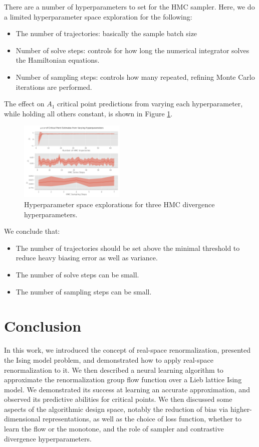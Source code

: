 \documentclass[%
    reprint,
    amsmath,amssymb,
    aps,
]{revtex4-2}
\begin{document}
There are a number of hyperparameters to set for the HMC sampler. 
Here, we do a limited hyperparameter space exploration for the following:
\begin{itemize}
    \item The number of trajectories: basically the sample batch size
    \item Number of solve steps: controls for how long the numerical integrator solves the Hamiltonian equations. 
    \item Number of sampling steps: controls how many repeated, refining Monte Carlo iterations are performed. 
\end{itemize}
The effect on $A_1$ critical point predictions from varying each hyperparameter, while holding all others constant, is shown in Figure \ref{fig:hmc-hyperparameters}. 

\begin{figure}[h]
    \includegraphics[width=0.45\textwidth]{tex/images/hmc-hyperparameters.png}
    \caption{\label{fig:hmc-hyperparameters}
        Hyperparameter space explorations for three HMC divergence hyperparameters. 
    }
\end{figure}

We conclude that:
\begin{itemize}
    \item The number of trajectories should be set above the minimal threshold to reduce heavy biasing error as well as variance. 
    \item The number of solve steps can be small. 
    \item The number of sampling steps can be small. 
\end{itemize}

\section{Conclusion}

In this work, we introduced the concept of real-space renormalization, presented the Ising model problem, and demonstrated how to apply real-space renormalization to it.
We then described a neural learning algorithm to approximate the renormalization group flow function over a Lieb lattice Ising model. 
We demonstrated its success at learning an accurate approximation, and observed its predictive abilities for critical points. 
We then discussed some aspects of the algorithmic design space, notably the reduction of bias via higher-dimensional representations, as well as the choice of loss function, whether to learn the flow or the monotone, and the role of sampler and contrastive divergence hyperparameters. 
\end{document}
